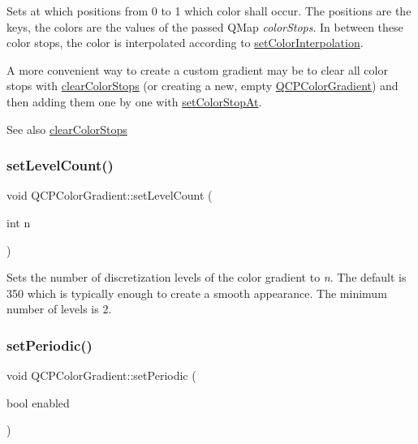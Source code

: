 Sets at which positions from 0 to 1 which color shall occur. The positions are the keys, the colors are the values of the passed Q\+Map {\itshape color\+Stops}. In between these color stops, the color is interpolated according to \mbox{\hyperlink{class_q_c_p_color_gradient_aa13fda86406e1d896a465a409ae63b38}{set\+Color\+Interpolation}}.

A more convenient way to create a custom gradient may be to clear all color stops with \mbox{\hyperlink{class_q_c_p_color_gradient_a939213e85f0d1279519d555c5fcfb6ad}{clear\+Color\+Stops}} (or creating a new, empty \mbox{\hyperlink{class_q_c_p_color_gradient}{Q\+C\+P\+Color\+Gradient}}) and then adding them one by one with \mbox{\hyperlink{class_q_c_p_color_gradient_a3b48be5e78079db1bb2a1188a4c3390e}{set\+Color\+Stop\+At}}.

\begin{DoxySeeAlso}{See also}
\mbox{\hyperlink{class_q_c_p_color_gradient_a939213e85f0d1279519d555c5fcfb6ad}{clear\+Color\+Stops}} 
\end{DoxySeeAlso}
\mbox{\label{class_q_c_p_color_gradient_a18da587eb4f7fc788ea28ba15b6a12de}} 
\subsubsection{\texorpdfstring{setLevelCount()}{setLevelCount()}}
{\footnotesize\ttfamily void Q\+C\+P\+Color\+Gradient\+::set\+Level\+Count (\begin{DoxyParamCaption}\item[{int}]{n }\end{DoxyParamCaption})}

Sets the number of discretization levels of the color gradient to {\itshape n}. The default is 350 which is typically enough to create a smooth appearance. The minimum number of levels is 2.

 \mbox{\label{class_q_c_p_color_gradient_a39d6448155fc00a219f239220d14bb39}} 
\subsubsection{\texorpdfstring{setPeriodic()}{setPeriodic()}}
{\footnotesize\ttfamily void Q\+C\+P\+Color\+Gradient\+::set\+Periodic (\begin{DoxyParamCaption}\item[{bool}]{enabled }\end{DoxyParamCaption})}


